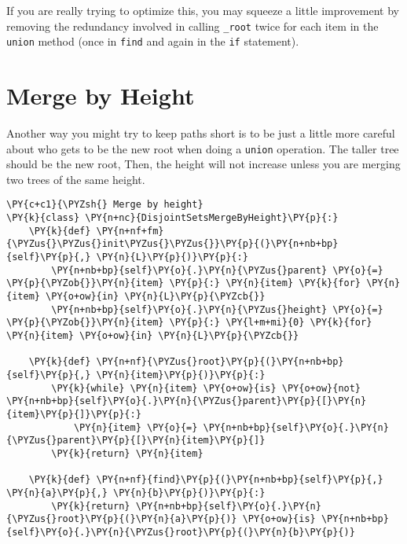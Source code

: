 If you are really trying to optimize this, you may squeeze a little improvement by removing the redundancy involved in calling \texttt{\_root} twice for each item in the \texttt{union} method (once in \texttt{find} and again in the \texttt{if} statement).

\chapter{Merge by Height}


Another way you might try to keep paths short is to be just a little more careful about who gets to be the new root when doing a \texttt{union} operation.  The taller tree should be the new root, Then, the height will not increase unless you are merging two trees of the same height.

\begin{Verbatim}[commandchars=\\\{\}]
\PY{c+c1}{\PYZsh{} Merge by height}
\PY{k}{class} \PY{n+nc}{DisjointSetsMergeByHeight}\PY{p}{:}
    \PY{k}{def} \PY{n+nf+fm}{\PYZus{}\PYZus{}init\PYZus{}\PYZus{}}\PY{p}{(}\PY{n+nb+bp}{self}\PY{p}{,} \PY{n}{L}\PY{p}{)}\PY{p}{:}
        \PY{n+nb+bp}{self}\PY{o}{.}\PY{n}{\PYZus{}parent} \PY{o}{=} \PY{p}{\PYZob{}}\PY{n}{item} \PY{p}{:} \PY{n}{item} \PY{k}{for} \PY{n}{item} \PY{o+ow}{in} \PY{n}{L}\PY{p}{\PYZcb{}}
        \PY{n+nb+bp}{self}\PY{o}{.}\PY{n}{\PYZus{}height} \PY{o}{=} \PY{p}{\PYZob{}}\PY{n}{item} \PY{p}{:} \PY{l+m+mi}{0} \PY{k}{for} \PY{n}{item} \PY{o+ow}{in} \PY{n}{L}\PY{p}{\PYZcb{}}

    \PY{k}{def} \PY{n+nf}{\PYZus{}root}\PY{p}{(}\PY{n+nb+bp}{self}\PY{p}{,} \PY{n}{item}\PY{p}{)}\PY{p}{:}
        \PY{k}{while} \PY{n}{item} \PY{o+ow}{is} \PY{o+ow}{not} \PY{n+nb+bp}{self}\PY{o}{.}\PY{n}{\PYZus{}parent}\PY{p}{[}\PY{n}{item}\PY{p}{]}\PY{p}{:}
            \PY{n}{item} \PY{o}{=} \PY{n+nb+bp}{self}\PY{o}{.}\PY{n}{\PYZus{}parent}\PY{p}{[}\PY{n}{item}\PY{p}{]}
        \PY{k}{return} \PY{n}{item}

    \PY{k}{def} \PY{n+nf}{find}\PY{p}{(}\PY{n+nb+bp}{self}\PY{p}{,} \PY{n}{a}\PY{p}{,} \PY{n}{b}\PY{p}{)}\PY{p}{:}
        \PY{k}{return} \PY{n+nb+bp}{self}\PY{o}{.}\PY{n}{\PYZus{}root}\PY{p}{(}\PY{n}{a}\PY{p}{)} \PY{o+ow}{is} \PY{n+nb+bp}{self}\PY{o}{.}\PY{n}{\PYZus{}root}\PY{p}{(}\PY{n}{b}\PY{p}{)}


\end{Verbatim}
